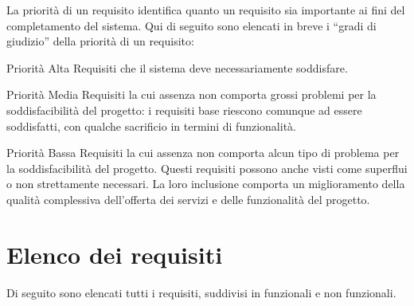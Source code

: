 La priorità di un requisito identifica quanto un requisito sia importante ai fini del completamento del sistema.
Qui di seguito sono elencati in breve i ``gradi di giudizio'' della priorità di un requisito:
\begin{descriptionInd}
	\item[Priorità Alta] Requisiti che il sistema deve necessariamente soddisfare.
	\item[Priorità Media] Requisiti la cui assenza non comporta grossi problemi per la soddisfacibilità del progetto: i requisiti base riescono comunque ad essere soddisfatti, con qualche sacrificio in termini di funzionalità. 
	\item[Priorità Bassa] Requisiti la cui assenza non comporta alcun tipo di problema per la soddisfacibilità del progetto. Questi requisiti possono anche visti come superflui o non strettamente necessari. La loro inclusione comporta un miglioramento della qualità complessiva dell’offerta dei servizi e delle funzionalità del progetto.
\end{descriptionInd}

\newpage
\section{Elenco dei requisiti}
\label{sec:elenco_dei_requisiti}
Di seguito sono elencati tutti i requisiti, suddivisi in funzionali e non funzionali.


